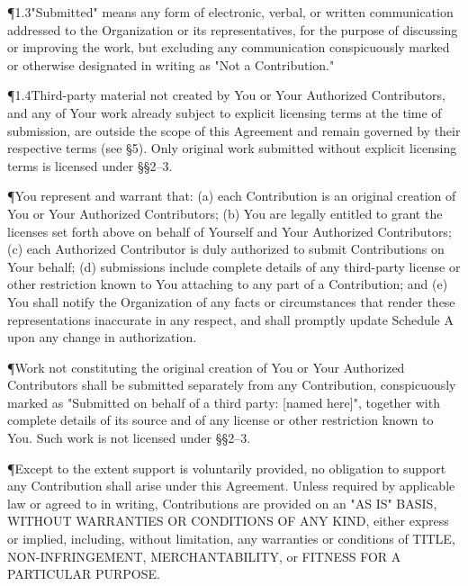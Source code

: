 \P{1.3}{"Submitted" means any form of electronic, verbal, or written communication addressed to the Organization or its representatives, for the purpose of discussing or improving the work, but excluding any communication conspicuously marked or otherwise designated in writing as "Not a Contribution."}

\P{1.4}{Third-party material not created by You or Your Authorized Contributors, and any of Your work already subject to explicit licensing terms at the time of submission, are outside the scope of this Agreement and remain governed by their respective terms (see \S5). Only original work submitted without explicit licensing terms is licensed under \S\S2--3.}

\clausecopyright

\clausepatent


\P{}{You represent and warrant that: (a) each Contribution is an original creation of You or Your Authorized Contributors; (b) You are legally entitled to grant the licenses set forth above on behalf of Yourself and Your Authorized Contributors; (c) each Authorized Contributor is duly authorized to submit Contributions on Your behalf; (d) submissions include complete details of any third-party license or other restriction known to You attaching to any part of a Contribution; and (e) You shall notify the Organization of any facts or circumstances that render these representations inaccurate in any respect, and shall promptly update Schedule A upon any change in authorization.}


\P{}{Work not constituting the original creation of You or Your Authorized Contributors shall be submitted separately from any Contribution, conspicuously marked as "Submitted on behalf of a third party: [named here]", together with complete details of its source and of any license or other restriction known to You. Such work is not licensed under \S\S2--3.}


\P{}{Except to the extent support is voluntarily provided, no obligation to support any Contribution shall arise under this Agreement. Unless required by applicable law or agreed to in writing, Contributions are provided on an "AS IS" BASIS, WITHOUT WARRANTIES OR CONDITIONS OF ANY KIND, either express or implied, including, without limitation, any warranties or conditions of TITLE, NON-INFRINGEMENT, MERCHANTABILITY, or FITNESS FOR A PARTICULAR PURPOSE.}

